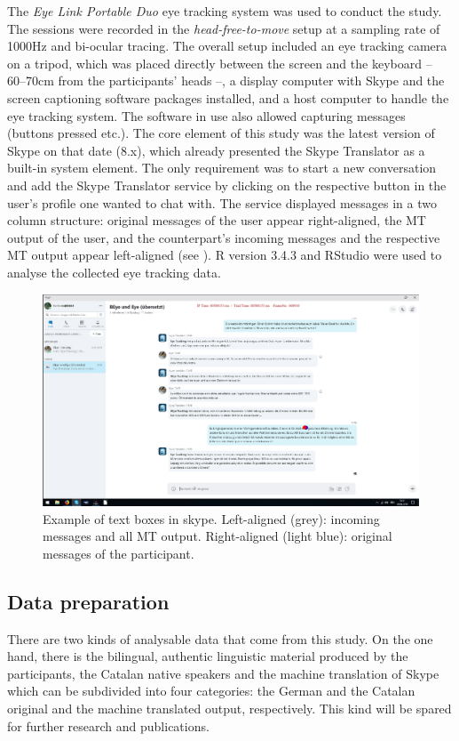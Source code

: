\documentclass[output=paper]{langscibook}
\begin{document}
The \textit{Eye Link Portable Duo} eye tracking system was used to conduct the study. The sessions were recorded in the \textit{head-free-to-move} setup at a sampling rate of 1000Hz and bi-ocular tracing. The overall setup included an eye tracking camera on a tripod, which was placed directly between the screen and the keyboard -- 60--70cm from the participants' heads --, a display computer with Skype and the screen captioning software packages installed, and a host computer to handle the eye tracking system. The software in use also allowed capturing messages (buttons pressed etc.). 
The core element of this study was the latest version of Skype on that date (8.x), which already presented the Skype Translator as a built-in system element. The only requirement was to start a new conversation and add the Skype Translator service by clicking on the respective button in the user's profile one wanted to chat with. The service displayed messages in a two column structure: original messages of the user appear right-aligned, the MT output of the user, and the counterpart's incoming messages and the respective MT output appear left-aligned (see ).
R version 3.4.3 \citep{r_development_core_team_r_2019} and RStudio were used to analyse the collected eye tracking data.

\begin{figure}
    \includegraphics[width=.95\textwidth]{figures/Playback_Image_TN3_Trial_1.png}
    \caption{Example of text boxes in skype. Left-aligned (grey): incoming messages and all MT output. Right-aligned (light blue): original messages of the participant.\label{textboxes}}
\end{figure}


\subsection{Data preparation}
\label{subsec:dataprep}
There are two kinds of analysable data that come from this study. On the one hand, there is the bilingual, authentic linguistic material produced by the participants, the Catalan native speakers and the machine translation of Skype which can be subdivided into four categories: the German and the Catalan original and the machine translated output, respectively. This kind will be spared for further research and publications.
\end{document}

